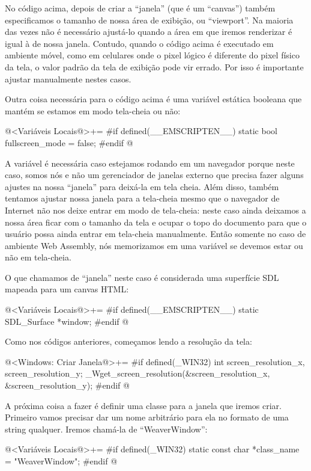 No código acima, depois de criar a ``janela'' (que é um ``canvas'') também
especificamos o tamanho de nossa área de exibição, ou ``viewport''. Na
maioria das vezes não é necessário ajustá-lo quando a área em que
iremos renderizar é igual à de nossa janela. Contudo, quando o código
acima é executado em ambiente móvel, como em celulares onde o pixel
lógico é diferente do pixel físico da tela, o valor padrão da tela de
exibição pode vir errado. Por isso é importante ajustar manualmente
nestes casos.

Outra coisa necessária para o código acima é uma variável estática
booleana que mantém se estamos em modo tela-cheia ou não:

\iniciocodigo
@<Variáveis Locais@>+=
#if defined(__EMSCRIPTEN__)
static bool fullscreen_mode = false;
#endif
@
\fimcodigo

A variável é necessária caso estejamos rodando em um navegador porque
neste caso, somos nós e não um gerenciador de janelas externo que
precisa fazer alguns ajustes na nossa ``janela'' para deixá-la em tela
cheia. Além disso, também tentamos ajustar nossa janela para a
tela-cheia mesmo que o navegador de Internet não nos deixe entrar em
modo de tela-cheia: neste caso ainda deixamos a nossa área ficar com o
tamanho da tela e ocupar o topo do documento para que o usuário possa
ainda entrar em tela-cheia manualmente. Então somente no caso de
ambiente Web Assembly, nós memorizamos em uma variável se devemos
estar ou não em tela-cheia.

O que chamamos de ``janela'' neste caso é considerada uma superfície
SDL mapeada para um canvas HTML:

\iniciocodigo
@<Variáveis Locais@>+=
#if defined(__EMSCRIPTEN__)
static SDL_Surface *window;
#endif
@
\fimcodigo


Como nos códigos anteriores, começamos lendo a resolução da tela:

\iniciocodigo
@<Windows: Criar Janela@>+=
#if defined(_WIN32)
int screen_resolution_x, screen_resolution_y;
_Wget_screen_resolution(&screen_resolution_x, &screen_resolution_y);
#endif
@
\fimcodigo

A próxima coisa a fazer é definir uma classe para a janela que iremos
criar. Primeiro vamos precisar dar um nome arbitrário para ela no
formato de uma string qualquer. Iremos chamá-la de ``WeaverWindow'':

\iniciocodigo
@<Variáveis Locais@>+=
#if defined(_WIN32)
static const char *class_name = "WeaverWindow";
#endif
@
\fimcodigo

